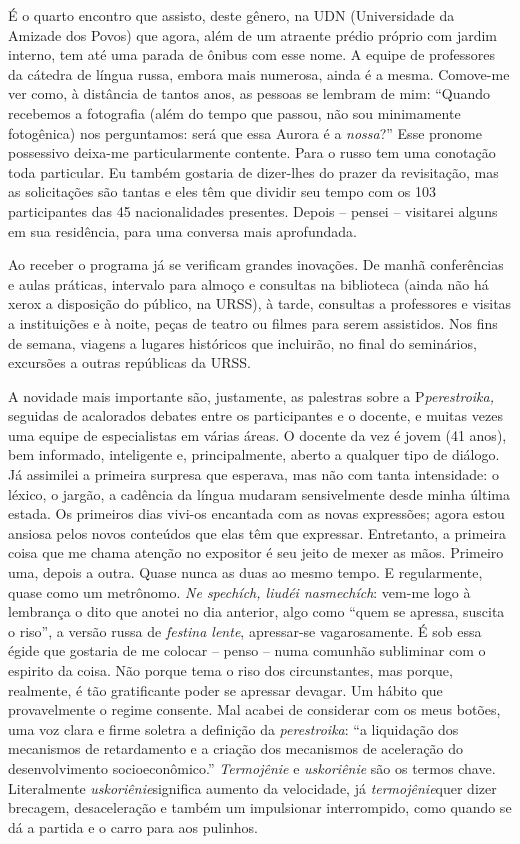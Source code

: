 É o quarto encontro que assisto, deste gênero, na UDN (Universidade da
Amizade dos Povos) que agora, além de um atraente prédio próprio com
jardim interno, tem até uma parada de ônibus com esse nome. A equipe de
professores da cátedra de língua russa, embora mais numerosa, ainda é a
mesma. Comove-me ver como, à distância de tantos anos, as pessoas se
lembram de mim: ``Quando recebemos a fotografia (além do tempo que
passou, não sou minimamente fotogênica) nos perguntamos: será que essa
Aurora é a \emph{nossa}?'' Esse pronome possessivo deixa-me
particularmente contente. Para o russo tem uma conotação toda
particular. Eu também gostaria de dizer-lhes do prazer da revisitação,
mas as solicitações são tantas e eles têm que dividir seu tempo com os
103 participantes das 45 nacionalidades presentes. Depois -- pensei --
visitarei alguns em sua residência, para uma conversa mais aprofundada.

Ao receber o programa já se verificam grandes inovações. De manhã
conferências e aulas práticas, intervalo para almoço e consultas na
biblioteca (ainda não há xerox a disposição do público, na URSS), à
tarde, consultas a professores e visitas a instituições e à noite, peças
de teatro ou filmes para serem assistidos. Nos fins de semana, viagens a
lugares históricos que incluirão, no final do seminários, excursões a
outras repúblicas da URSS.

A novidade mais importante são, justamente, as palestras sobre a
P\emph{perestroika,} seguidas de acalorados debates entre os
participantes e o docente, e muitas vezes uma equipe de especialistas em
várias áreas. O docente da vez é jovem (41 anos), bem informado,
inteligente e, principalmente, aberto a qualquer tipo de diálogo. Já
assimilei a primeira surpresa que esperava, mas não com tanta
intensidade: o léxico, o jargão, a cadência da língua mudaram
sensivelmente desde minha última estada. Os primeiros dias vivi-os
encantada com as novas expressões; agora estou ansiosa pelos novos
conteúdos que elas têm que expressar. Entretanto, a primeira coisa que
me chama atenção no expositor é seu jeito de mexer as mãos. Primeiro
uma, depois a outra. Quase nunca as duas ao mesmo tempo. E regularmente,
quase como um metrônomo. \emph{Ne spechích, liudéi nasmechích}: vem-me
logo à lembrança o dito que anotei no dia anterior, algo como ``quem se
apressa, suscita o riso'', a versão russa de \emph{festina lente},
apressar-se vagarosamente. É sob essa égide que gostaria de me colocar
-- penso -- numa comunhão subliminar com o espirito da coisa. Não porque
tema o riso dos circunstantes, mas porque, realmente, é tão gratificante
poder se apressar devagar. Um hábito que provavelmente o regime
consente. Mal acabei de considerar com os meus botões, uma voz clara e
firme soletra a definição da \emph{perestroika}: ``a liquidação dos
mecanismos de retardamento e a criação dos mecanismos de aceleração do
desenvolvimento socioeconômico.'' \emph{Termojênie} e \emph{uskoriênie}
são os termos chave. Literalmente \emph{uskoriênie}significa aumento da
velocidade, já \emph{termojênie}quer dizer brecagem, desaceleração e
também um impulsionar interrompido, como quando se dá a partida e o
carro para aos pulinhos.

